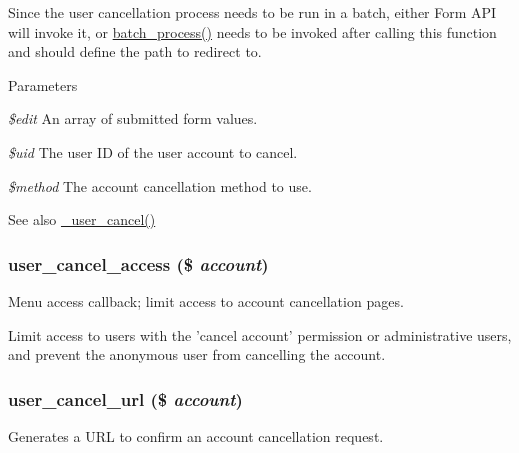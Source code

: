Since the user cancellation process needs to be run in a batch, either Form API will invoke it, or \hyperlink{group__batch_gab17f59692632a482cee4f65f27d082f7}{batch\_\-process()} needs to be invoked after calling this function and should define the path to redirect to.


\begin{DoxyParams}{Parameters}
\item[{\em \$edit}]An array of submitted form values. \item[{\em \$uid}]The user ID of the user account to cancel. \item[{\em \$method}]The account cancellation method to use.\end{DoxyParams}
\begin{DoxySeeAlso}{See also}
\hyperlink{user_8module_afc9203f67609047039df65af5de60739}{\_\-user\_\-cancel()} 
\end{DoxySeeAlso}
\hypertarget{user_8module_a1a179fa6a35c42c0c9234b7f67e3715f}{
\subsubsection[{user\_\-cancel\_\-access}]{\setlength{\rightskip}{0pt plus 5cm}user\_\-cancel\_\-access (\$ {\em account})}}
\label{user_8module_a1a179fa6a35c42c0c9234b7f67e3715f}
Menu access callback; limit access to account cancellation pages.

Limit access to users with the 'cancel account' permission or administrative users, and prevent the anonymous user from cancelling the account. \hypertarget{user_8module_afdf3514e3f6d0c8de3f68ff5e98452c2}{
\subsubsection[{user\_\-cancel\_\-url}]{\setlength{\rightskip}{0pt plus 5cm}user\_\-cancel\_\-url (\$ {\em account})}}
\label{user_8module_afdf3514e3f6d0c8de3f68ff5e98452c2}
Generates a URL to confirm an account cancellation request.


